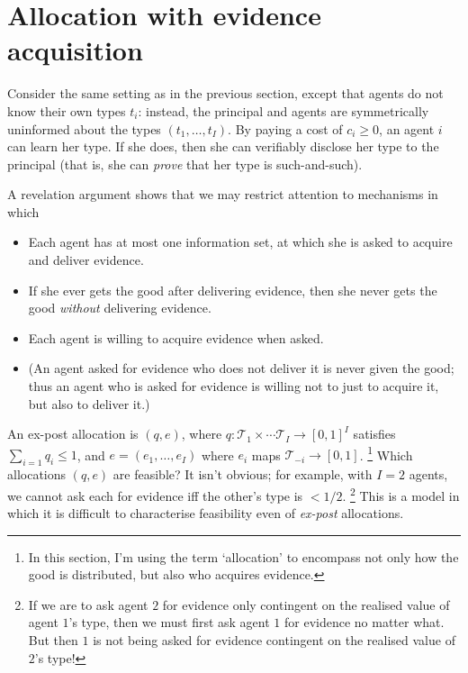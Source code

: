 \section{Allocation with evidence acquisition}
\label{sec:ch2:bdl21}

Consider the same setting as in the previous section,
except that agents do not know their own types $t_i$: instead, the principal and agents are symmetrically uninformed about the types $(t_1,\dots,t_I)$.
By paying a cost of $c_i \geq 0$, an agent $i$ can learn her type.
If she does, then she can verifiably disclose her type to the principal (that is, she can \emph{prove} that her type is such-and-such).


A revelation argument shows that we may restrict attention to mechanisms in which
%
\begin{itemize}

	\item Each agent has at most one information set,
	at which she is asked to acquire and deliver evidence.

	\item If she ever gets the good after delivering evidence,
	then she never gets the good \emph{without} delivering evidence.

	\item Each agent is willing to acquire evidence when asked.

	\item (An agent asked for evidence who does not deliver it is never given the good; thus an agent who is asked for evidence is willing not to just to acquire it, but also to deliver it.)

\end{itemize}

An ex-post allocation is $(q,e)$, where $q : \mathcal{T}_1 \times \cdots \mathcal{T}_I \to [0,1]^I$ satisfies $\sum_{i=1} q_i \leq 1$,
and $e = (e_1,\dots,e_I)$ where $e_i$ maps $\mathcal{T}_{-i} \to [0,1]$.%
	\footnote{In this section, I'm using the term `allocation' to encompass not only how the good is distributed, but also who acquires evidence.}
Which allocations $(q,e)$ are feasible?
It isn't obvious; for example, with $I=2$ agents, we cannot ask each for evidence iff the other's type is $<1/2$.%
	\footnote{If we are to ask agent $2$ for evidence only contingent on the realised value of agent $1$'s type, then we must first ask agent $1$ for evidence no matter what.
	But then $1$ is not being asked for evidence contingent on the realised value of $2$'s type!}
This is a model in which it is difficult to characterise feasibility even of \emph{ex-post} allocations.

